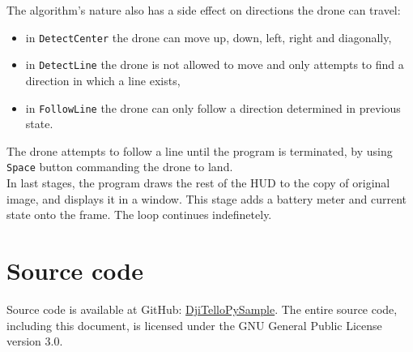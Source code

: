 \documentclass[english,10pt,a4paper,titlepage]{article}
\begin{document}
	The algorithm's nature also has a side effect on directions the drone can travel:
	\begin{itemize}
		\item in \verb|DetectCenter| the drone can move up, down, left, right and diagonally,
		\item in \verb|DetectLine| the drone is not allowed to move and only attempts to find a direction in which a line exists,
		\item in \verb|FollowLine| the drone can only follow a direction determined in previous state.
	\end{itemize}
	
	The drone attempts to follow a line until the program is terminated, by using \verb|Space| button commanding the drone to land. \\
	
	In last stages, the program draws the rest of the HUD to the copy of original image, and displays it in a window. This stage adds a battery meter and current state onto the frame. The loop continues indefinetely.
	
	\section{Source code}
	Source code is available at GitHub: \href{https://github.com/mattroot/DjiTelloPySample}{DjiTelloPySample}. The entire source code, including this document, is licensed under the GNU General Public License version 3.0.
	
\end{document}
